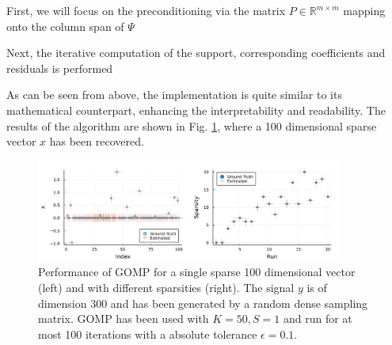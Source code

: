 

First, we will focus on the preconditioning via the matrix $P \in \mathbb{R}^{m \times m}$ mapping onto the
column span of $\Psi$



Next, the iterative computation of the support, corresponding coefficients and residuals is performed



As can be seen from above, the implementation is quite similar to its mathematical counterpart, enhancing the interpretability and readability. 
The results of the algorithm are shown in Fig. \ref{JM:fig:GOMP}, where a 100 dimensional sparse vector $x$ has been recovered.

\begin{figure}
    \includegraphics[width = 0.9\textwidth]{../figures/merged.pdf}
    \caption{Performance of GOMP for a single sparse 100 dimensional vector (left) and with different sparsities (right). The signal $y$ is of dimension 300 and has been generated by a random dense sampling matrix.
    GOMP has been used with $K=50, S=1$ and run for at most 100 iterations with a absolute tolerance $\epsilon = 0.1$.}
    \label{JM:fig:GOMP}
\end{figure}

\newpage